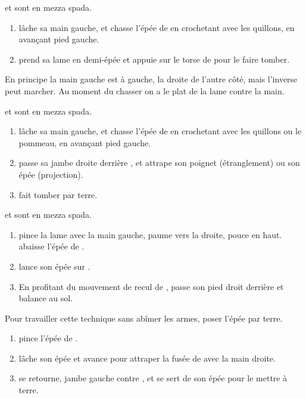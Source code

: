 \begin{technique}

\A et \D sont en mezza spada.

\begin{enumerate}
	\item \A lâche sa main gauche, et chasse l'épée de \D en crochetant avec les quillons, en avançant pied gauche.
	\item \A prend sa lame en demi-épée et appuie sur le torse de \D pour le faire tomber.
\end{enumerate}

En principe la main gauche est à gauche, la droite de l'autre côté, mais l'inverse peut marcher.
Au moment du chasser on a le plat de la lame contre la main.
\end{technique}


\begin{technique}

\A et \D sont en mezza spada.

\begin{enumerate}
	\item \A lâche sa main gauche, et chasse l'épée de \D en crochetant avec les quillons ou le pommeau, en avançant pied gauche.
	\item \A passe sa jambe droite derrière \D, et attrape son poignet (étranglement) ou son épée (projection).
	\item \A fait tomber \D par terre.
\end{enumerate}
\end{technique}


\begin{technique}

\A et \D sont en mezza spada.

\begin{enumerate}
	\item \A pince la lame avec la main gauche, paume vers la droite, pouce en haut.
		\A abaisse l'épée de \D.
	\item \A lance son épée sur \D.
	\item En profitant du mouvement de recul de \D, \A passe son pied droit derrière et balance \D au sol.
\end{enumerate}

Pour travailler cette technique sans abîmer les armes, poser l'épée par terre.
\end{technique}


\begin{technique}

\begin{enumerate}
	\item \A pince l'épée de \D.
	\item \A lâche son épée et avance pour attraper la fusée de \D avec la main droite.
	\item \A se retourne, jambe gauche contre \D, et se sert de son épée pour le mettre à terre.
\end{enumerate}
\end{technique}


